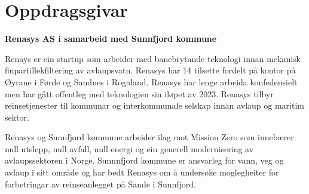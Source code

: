 \section{Oppdragsgivar}
\textbf{Renasys AS i samarbeid med Sunnfjord kommune}

Renays\citep{Renasys} er ein startup som arbeider med banebrytande teknologi innan mekanisk finpartillekfiltering av avlaupsvatn.
Renasys har 14 tilsette fordelt på kontor på Øyrane i Førde og Sandnes i Rogaland. 
Renasys har lenge arbeida konfedensielt men har gått offentleg med teknologien sin iløpet av 2023. 
Renasys tilbyr reinsetjenester til kommunar og interkommunale selskap innan avlaup og maritim sektor.

Renasys og Sunnfjord kommune\citep{SunnfjordKommune} arbeider ilag mot Mission Zero som innebærer 
null utslepp, null avfall, null energi og ein generell modernisering av avlaupssektoren i Norge.
Sunnnfjord kommune er ansvarleg for vann, veg og avlaup i sitt område og har bedt 
Renasys om å undersøke moglegheiter for forbetringar av reinseanlegget på Sande i Sunnfjord.
\newline
\newline

